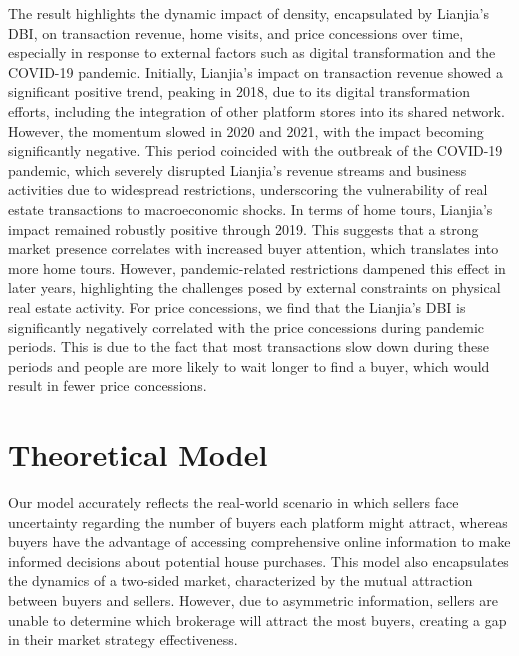 \documentclass[12pt]{article}
\begin{document}
The result highlights the dynamic impact of density, encapsulated by Lianjia's DBI, on transaction revenue, home visits, and price concessions over time, especially in response to external factors such as digital transformation and the COVID-19 pandemic. Initially, Lianjia's impact on transaction revenue showed a significant positive trend, peaking in 2018, due to its digital transformation efforts, including the integration of other platform stores into its shared network.  However, the momentum slowed in 2020 and 2021, with the impact becoming significantly negative. This period coincided with the outbreak of the COVID-19 pandemic, which severely disrupted Lianjia's revenue streams and business activities due to widespread restrictions, underscoring the vulnerability of real estate transactions to macroeconomic shocks. In terms of home tours, Lianjia's impact remained robustly positive through 2019. This suggests that a strong market presence correlates with increased buyer attention, which translates into more home tours. However, pandemic-related restrictions dampened this effect in later years, highlighting the challenges posed by external constraints on physical real estate activity. For price concessions, we find that the Lianjia's DBI is significantly negatively correlated with the price concessions during pandemic periods. This is due to the fact that most transactions slow down during these periods and people are more likely to wait longer to find a buyer, which would result in fewer price concessions.

\section{Theoretical Model} \label{sec:theoretical_model}

Our model accurately reflects the real-world scenario in which sellers face uncertainty regarding the number of buyers each platform might attract, whereas buyers have the advantage of accessing comprehensive online information to make informed decisions about potential house purchases. This model also encapsulates the dynamics of a two-sided market, characterized by the mutual attraction between buyers and sellers. However, due to asymmetric information, sellers are unable to determine which brokerage will attract the most buyers, creating a gap in their market strategy effectiveness.
\end{document}
